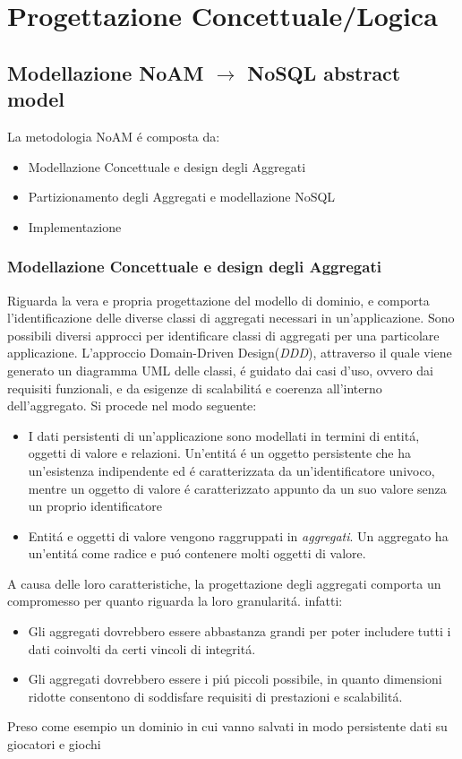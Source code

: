 \chapter{Progettazione Concettuale/Logica}




\section{Modellazione NoAM $\to$ NoSQL abstract model}
La metodologia NoAM é composta da:
\begin{itemize}
    \item Modellazione Concettuale e design degli Aggregati
    \item Partizionamento degli Aggregati e modellazione NoSQL
    \item Implementazione
\end{itemize}

\subsection{Modellazione Concettuale e design degli Aggregati}
Riguarda la vera e propria progettazione del modello di dominio, e comporta l'identificazione
delle diverse classi di aggregati necessari in un'applicazione.
Sono possibili diversi approcci per identificare classi di aggregati per una particolare applicazione.
L'approccio Domain-Driven Design(\emph{DDD}), attraverso il quale viene generato un diagramma UML delle classi,
é guidato dai casi d'uso, ovvero dai requisiti funzionali, e da esigenze di scalabilitá e coerenza all'interno dell'aggregato.
Si procede nel modo seguente:
\begin{itemize}
    \item I dati persistenti di un'applicazione sono modellati in termini di entitá, oggetti di valore e
    relazioni.
    Un'entitá é un oggetto persistente che ha un'esistenza indipendente ed é caratterizzata da un'identificatore
    univoco, mentre un oggetto di valore é caratterizzato appunto da un suo valore senza un proprio identificatore
    \item Entitá e oggetti di valore vengono raggruppati in \emph{aggregati}.
    Un aggregato ha un'entitá come radice e puó contenere molti oggetti di valore.
\end{itemize}
A causa delle loro caratteristiche, la progettazione degli aggregati comporta un compromesso per quanto riguarda
la loro granularitá. infatti:
\begin{itemize}
    \item Gli aggregati dovrebbero essere abbastanza grandi per poter includere tutti i dati coinvolti da
    certi vincoli di integritá.
    \item Gli aggregati dovrebbero essere i piú piccoli possibile, in quanto dimensioni ridotte consentono di
    soddisfare requisiti di prestazioni e scalabilitá.
\end{itemize}
Preso come esempio un dominio in cui vanno salvati in modo persistente dati su giocatori e giochi

